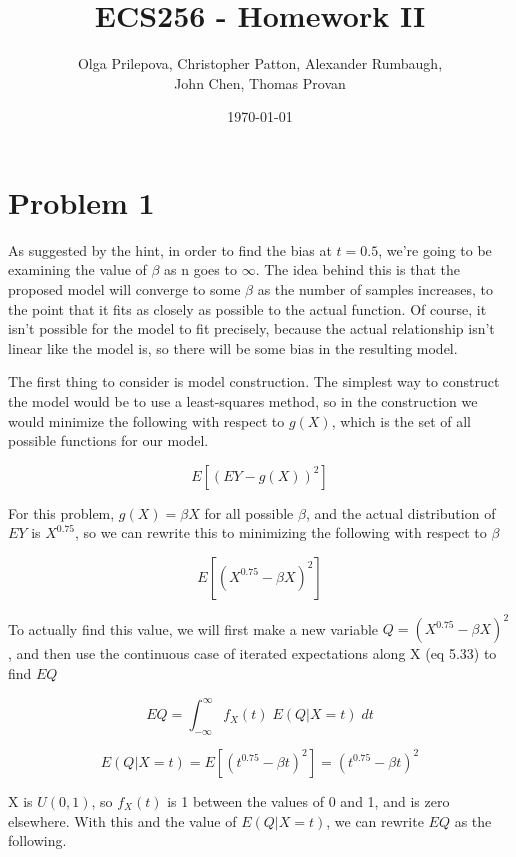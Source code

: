\documentclass[letter]{article}
\author{Olga Prilepova, Christopher Patton, Alexander Rumbaugh, \\ John Chen, Thomas Provan}
\date{\today}
\title{ECS256 - Homework II}
\begin{document}
\maketitle


\section*{Problem 1} 

As suggested by the hint, in order to find the bias at $t=0.5$, we're going to be examining the value of $\beta$ as n goes to $\infty$. The idea behind this is that the proposed model will converge to some $\beta$ as the number of samples increases, to the point that it fits as closely as possible to the actual function. Of course, it isn't possible for the model to fit precisely, because the actual relationship isn't linear like the model is, so there will be some bias in the resulting model. 

The first thing to consider is model construction. The simplest way to construct the model would be to use a least-squares method, so in the construction we would  minimize the following with respect to $g(X)$, which is the set of all possible functions for our model.

\begin{equation}
	E[(EY - g(X))^2]
\end{equation}

For this problem, $g(X)=\beta X$ for all possible $\beta$, and the actual distribution of $EY$ is $X^{0.75}$, so we can rewrite this to minimizing the following with respect to $\beta$

\begin{equation}
	E[(X^{0.75} - \beta X)^2]
\end{equation}

To actually find this value, we will first make a new variable $Q=(X^{0.75} - \beta X)^2$, and then use the continuous case of iterated expectations along X (eq 5.33) to find $EQ$

\begin{equation}
	EQ = \int _{-\infty} ^\infty f_X(t) \; E(Q | X = t)\; dt
\end{equation}

\begin{equation}
	E(Q | X = t) = E[(t^{0.75} - \beta t)^2] = (t^{0.75} - \beta t)^2
\end{equation}

X is $U(0,1)$, so $f_X(t)$ is 1 between the values of 0 and 1, and is zero elsewhere. With this and the value of $E(Q | X = t)$, we can rewrite $EQ$ as the following.
\end{document}
